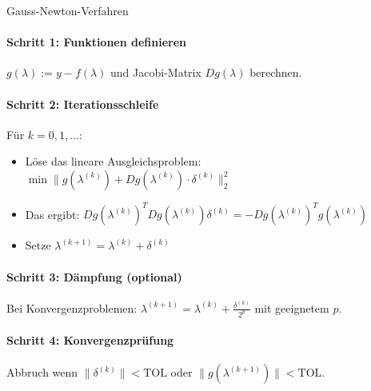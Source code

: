\begin{KR}{Gauss-Newton-Verfahren}\\
\paragraph{Schritt 1: Funktionen definieren}
$g(\lambda) := y - f(\lambda)$ und Jacobi-Matrix $Dg(\lambda)$ berechnen.

\paragraph{Schritt 2: Iterationsschleife}
Für $k = 0, 1, ...$:
\begin{itemize}
    \item Löse das lineare Ausgleichsproblem: $\min \|g(\lambda^{(k)}) + Dg(\lambda^{(k)}) \cdot \delta^{(k)}\|_2^2$
    \item Das ergibt: $Dg(\lambda^{(k)})^T Dg(\lambda^{(k)}) \delta^{(k)} = -Dg(\lambda^{(k)})^T g(\lambda^{(k)})$
    \item Setze $\lambda^{(k+1)} = \lambda^{(k)} + \delta^{(k)}$
\end{itemize}

\paragraph{Schritt 3: Dämpfung (optional)}
Bei Konvergenzproblemen: $\lambda^{(k+1)} = \lambda^{(k)} + \frac{\delta^{(k)}}{2^p}$ mit geeignetem $p$.

\paragraph{Schritt 4: Konvergenzprüfung}
Abbruch wenn $\|\delta^{(k)}\| < \text{TOL}$ oder $\|g(\lambda^{(k+1)})\| < \text{TOL}$.
\end{KR}

